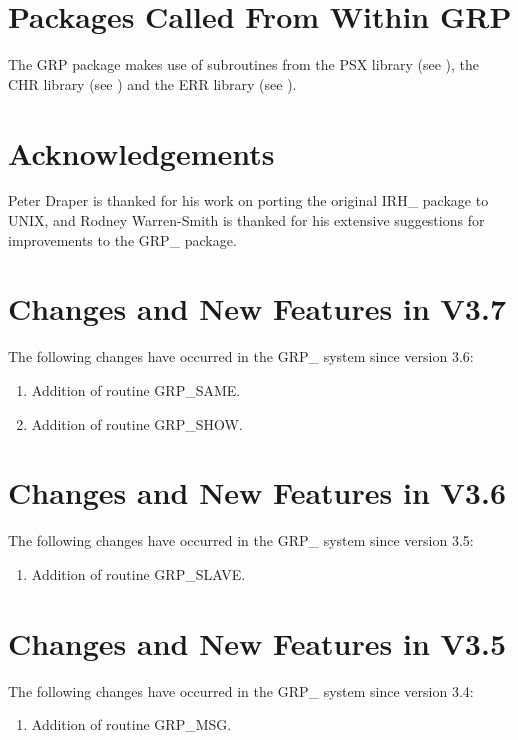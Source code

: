 \section{\label{APP:PACK}Packages Called From Within GRP}
The GRP package makes use of subroutines from the PSX
library (see ), the CHR library (see
) and the ERR library (see
).

\section{Acknowledgements}

Peter Draper is thanked for his work on porting the original IRH\_ package to
UNIX, and Rodney Warren-Smith is thanked for his extensive suggestions for
improvements to the GRP\_ package.

\section{Changes and New Features in V3.7}
The following changes have occurred in the GRP\_ system since version 3.6:

\begin{enumerate}
\item Addition of routine GRP\_SAME.
\item Addition of routine GRP\_SHOW.
\end{enumerate}

\section{Changes and New Features in V3.6}
The following changes have occurred in the GRP\_ system since version 3.5:

\begin{enumerate}
\item Addition of routine GRP\_SLAVE.
\end{enumerate}

\section{Changes and New Features in V3.5}
The following changes have occurred in the GRP\_ system since version 3.4:

\begin{enumerate}
\item Addition of routine GRP\_MSG.
\end{enumerate}

